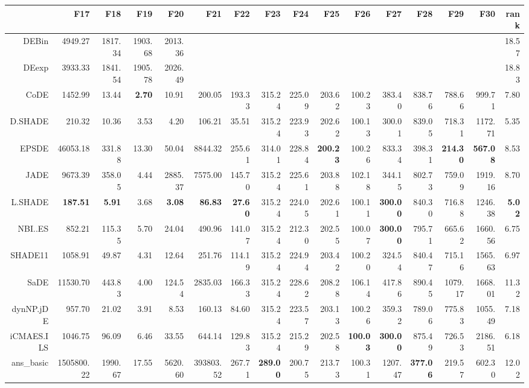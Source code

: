 \begin{table}[h!]
\centering
\begingroup\tiny
\begin{tabular}{rrrrrrrrrrrrrrrr}
  \hline
 & F17 & F18 & F19 & F20 & F21 & F22 & F23 & F24 & F25 & F26 & F27 & F28 & F29 & F30 & rank \\ 
  \hline
DEBin & 4949.27 & 1817.34 & 1903.68 & 2013.36 &  &  &  &  &  &  &  &  &  &  & 18.57 \\ 
  DEexp & 3933.33 & 1841.54 & 1905.78 & 2026.49 &  &  &  &  &  &  &  &  &  &  & 18.83 \\ 
  CoDE & 1452.99 & 13.44 & \textbf{2.70} & 10.91 & 200.05 & 193.33 & 315.24 & 225.09 & 203.62 & 100.23 & 383.40 & 838.76 & 788.66 & 999.71 & 7.80 \\ 
  D.SHADE & 210.32 & 10.36 & 3.53 & 4.20 & 106.21 & 35.51 & 315.24 & 223.93 & 202.62 & 100.13 & 300.01 & 839.05 & 718.31 & 1172.71 & 5.35 \\ 
  EPSDE & 46053.18 & 331.88 & 13.30 & 50.04 & 8844.32 & 255.61 & 314.01 & 228.84 & \textbf{200.23} & 100.26 & 833.34 & 398.31 & \textbf{214.30} & \textbf{567.08} & 8.53 \\ 
  JADE & 9673.39 & 358.05 & 4.44 & 2885.37 & 7575.00 & 145.70 & 315.24 & 225.61 & 203.88 & 102.18 & 344.15 & 802.73 & 759.09 & 1919.16 & 8.70 \\ 
  L.SHADE & \textbf{187.51} & \textbf{5.91} & 3.68 & \textbf{3.08} & \textbf{86.83} & \textbf{27.60} & 315.24 & 224.05 & 202.61 & 100.11 & \textbf{300.00} & 840.30 & 716.88 & 1246.38 & \textbf{5.02} \\ 
  NBI..ES & 852.21 & 115.35 & 5.70 & 24.04 & 490.96 & 141.07 & 315.24 & 212.30 & 202.55 & 100.07 & \textbf{300.00} & 795.71 & 665.62 & 1660.56 & 6.75 \\ 
  SHADE11 & 1058.91 & 49.87 & 4.31 & 12.64 & 251.76 & 114.19 & 315.24 & 224.94 & 203.42 & 100.20 & 324.54 & 840.47 & 715.16 & 1565.63 & 6.97 \\ 
  SaDE & 11530.70 & 443.83 & 4.00 & 124.54 & 2835.03 & 166.33 & 315.24 & 228.62 & 208.28 & 106.14 & 417.86 & 890.45 & 1079.17 & 1668.01 & 11.32 \\ 
  dynNP.jDE & 957.70 & 21.02 & 3.91 & 8.53 & 160.13 & 84.60 & 315.24 & 223.57 & 203.13 & 100.26 & 359.32 & 789.06 & 775.83 & 1055.49 & 7.18 \\ 
  iCMAES.ILS & 1046.75 & 96.09 & 6.46 & 33.55 & 644.14 & 129.83 & 315.24 & 215.29 & 202.58 & \textbf{100.03} & \textbf{300.00} & 875.49 & 726.53 & 2186.51 & 6.18 \\ 
  ans\_basic & 1505800.22 & 1990.67 & 17.55 & 5620.60 & 393803.52 & 267.71 & \textbf{289.00} & 200.75 & 213.73 & 100.31 & 1207.47 & \textbf{377.06} & 219.57 & 602.30 & 12.02 \\ 

\end{tabular}
\end{table}
